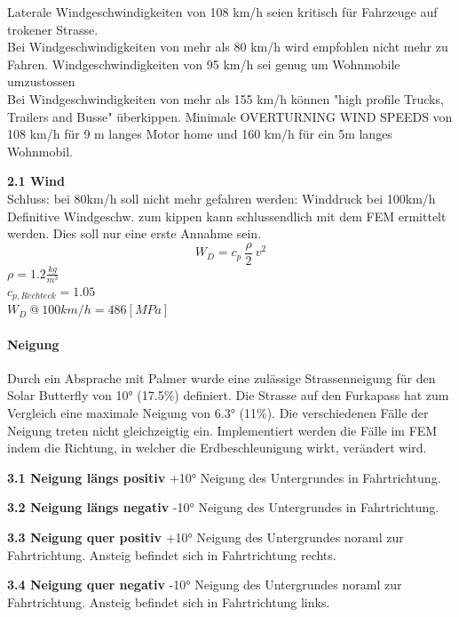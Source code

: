   \cite{Wind.1} Laterale Windgeschwindigkeiten von 108 km/h seien kritisch für Fahrzeuge auf trokener Strasse.\\
  \cite{Wind.2} Bei Windgeschwindigkeiten von mehr als 80 km/h wird empfohlen nicht mehr zu Fahren. Windgeschwindigkeiten von 95 km/h sei genug um Wohnmobile umzustossen\\
  \cite{Wind.3} Bei Windgeschwindigkeiten von mehr als 155 km/h können "high profile Trucks, Trailers and Busse" überkippen. Minimale OVERTURNING WIND SPEEDS von 108 km/h für 9 m langes Motor home und 160 km/h für ein 5m langes Wohnmobil.

  \begin{description}
    \item \textbf{2.1 Wind}\\
    Schluss: bei 80km/h soll nicht mehr gefahren werden: Winddruck bei 100km/h\\
    Definitive Windgeschw. zum kippen kann schlussendlich mit dem FEM ermittelt werden. Dies soll nur eine erste Annahme sein.
    \begin{equation}
      \label{Winddruck}
      W_D = c_p \: \frac{\rho}{2}\: v^2
    \end{equation}
    $\rho = 1.2 \frac{kg}{m^3}$\\
    $c_{p,Rechteck} = 1.05$\\
    $W_D \:@\: 100 km/h= 486 \left[MPa \right]$
  \end{description}

  \paragraph{Neigung}
  Durch ein Absprache mit Palmer wurde eine zulässige Strassenneigung für den Solar Butterfly von 10° (17.5\%) definiert. Die Strasse auf den Furkapass hat zum Vergleich eine maximale Neigung von 6.3° (11\%). Die verschiedenen Fälle der Neigung treten nicht gleichzeigtig ein. Implementiert werden die Fälle im FEM indem die Richtung, in welcher die Erdbeschleunigung wirkt, verändert wird.

  \begin{description}
    \item \textbf{3.1 Neigung längs positiv} +10° Neigung des Untergrundes in Fahrtrichtung.
    \item \textbf{3.2 Neigung längs negativ} -10° Neigung des Untergrundes in Fahrtrichtung.
    \item \textbf{3.3 Neigung quer positiv} +10° Neigung des Untergrundes noraml zur Fahrtrichtung. Ansteig befindet sich in Fahrtrichtung rechts.
    \item \textbf{3.4 Neigung quer negativ} -10° Neigung des Untergrundes noraml zur Fahrtrichtung. Ansteig befindet sich in Fahrtrichtung links.
  \end{description}


